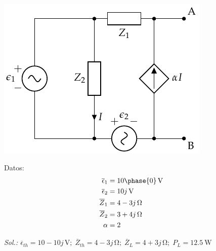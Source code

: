\begin{enumerate}
\begin{minipage}{0.5\textwidth}
\begin{center}
\includegraphics{../figs/Thevenin5}
\end{center}
\end{minipage}
\begin{minipage}{0.5\textwidth}
\hspace{20mm}Datos:
  \begin{align*}
    \overline{\epsilon}_1 &= \SI[parse-numbers=false]{10\phase{0}}{\volt}\\
    \overline{\epsilon}_2 &= \SI[parse-numbers=false]{10j}{\volt}\\
    \overline{Z}_1 &= \SI[parse-numbers=false]{4 - 3j}{\ohm}\\
    \overline{Z}_2 &= \SI[parse-numbers=false]{3 + 4j}{\ohm}\\
    \alpha &= 2
  \end{align*}
\end{minipage}

\vspace{2mm}
\emph{Sol.:\; $
  \overline{\epsilon}_{th} =  10 - 10j \,\si{\volt};\;
  \overline{Z}_{th} = 4 - 3j \,\si{\ohm};\; \overline{Z}_L = 4 + 3j\,\si{\ohm};\; P_L = \qty{12.5}{\watt}
  $}

\end{enumerate}
